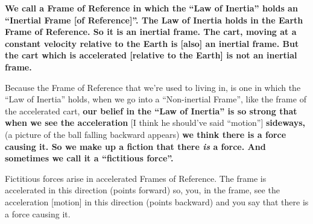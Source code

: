 \documentclass[a6paper]{article}
\begin{document}
\textbf{We call a Frame of Reference in which the ``Law of Inertia'' holds an ``Inertial Frame [of Reference]''. The Law of Inertia holds in the Earth Frame of Reference. So it is an inertial frame. The cart, moving at a constant velocity relative to the Earth is [also] an inertial frame. But the cart which is accelerated [relative to the Earth] is not an inertial frame.}

Because the Frame of Reference that we're used to living in, is one in which the ``Law of Inertia'' holds, when we go into a ``Non-inertial Frame'', like the frame of the accelerated cart, \textbf{our belief in the ``Law of Inertia'' is so strong that when we see the acceleration} [I think he should've said ``motion''] \textbf{sideways,} (a picture of the ball falling backward appears) \textbf{we think there is a force causing it. So we make up a fiction that there \emph{is} a force. And sometimes we call it a ``fictitious force''.}

Fictitious forces arise in accelerated Frames of Reference. The frame is accelerated in this direction (points forward) so, you, in the frame, see the acceleration [motion] in this direction (points backward) and you say that there is a force causing it. 
\end{document}
